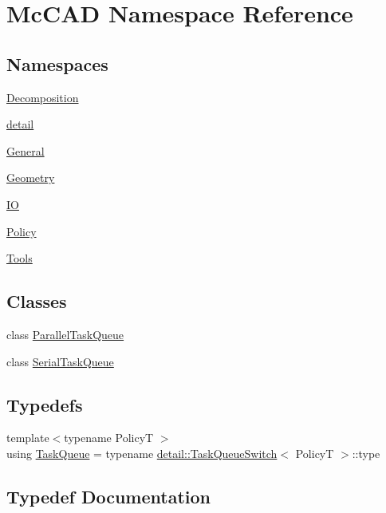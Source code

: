 \hypertarget{namespaceMcCAD}{}\section{Mc\+C\+AD Namespace Reference}
\label{namespaceMcCAD}
\subsection*{Namespaces}
\begin{DoxyCompactItemize}
\item 
 \hyperlink{namespaceMcCAD_1_1Decomposition}{Decomposition}
\item 
 \hyperlink{namespaceMcCAD_1_1detail}{detail}
\item 
 \hyperlink{namespaceMcCAD_1_1General}{General}
\item 
 \hyperlink{namespaceMcCAD_1_1Geometry}{Geometry}
\item 
 \hyperlink{namespaceMcCAD_1_1IO}{IO}
\item 
 \hyperlink{namespaceMcCAD_1_1Policy}{Policy}
\item 
 \hyperlink{namespaceMcCAD_1_1Tools}{Tools}
\end{DoxyCompactItemize}
\subsection*{Classes}
\begin{DoxyCompactItemize}
\item 
class \hyperlink{classMcCAD_1_1ParallelTaskQueue}{Parallel\+Task\+Queue}
\item 
class \hyperlink{classMcCAD_1_1SerialTaskQueue}{Serial\+Task\+Queue}
\end{DoxyCompactItemize}
\subsection*{Typedefs}
\begin{DoxyCompactItemize}
\item 
{\footnotesize template$<$typename PolicyT $>$ }\\using \hyperlink{namespaceMcCAD_a3a236cdf837ceb7812628ff36fc0b95e}{Task\+Queue} = typename \hyperlink{structMcCAD_1_1detail_1_1TaskQueueSwitch}{detail\+::\+Task\+Queue\+Switch}$<$ PolicyT $>$\+::type
\end{DoxyCompactItemize}


\subsection{Typedef Documentation}
\mbox{\label{namespaceMcCAD_a3a236cdf837ceb7812628ff36fc0b95e}} 
